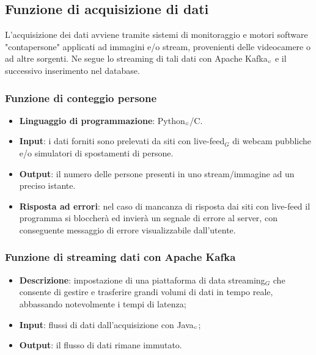 \subsection{Funzione di acquisizione di dati}\label{DescrizioneGeneraleFunzionalitàDelProdottoFunzioneDiAcquisizioneDiDati}
L'acquisizione dei dati avviene tramite sistemi di monitoraggio e motori software "contapersone" applicati ad immagini e/o stream, provenienti delle videocamere o ad altre sorgenti. Ne segue lo streaming di tali dati con Apache Kafka$_{\scaleto{G}{3pt}}$ e il successivo inserimento nel database.

\subsubsection{Funzione di conteggio persone}\label{DescrizioneGeneraleFunzionalitàDelProdottoFunzioneDiAcquisizioneDiDatiFunzioneDiConteggioPersone}
\begin{itemize}
\item \textbf{Linguaggio di programmazione}: Python$_{\scaleto{G}{3pt}}$/C.
\item \textbf{Input}: i dati forniti sono prelevati da siti con live-feed$_G$ di webcam pubbliche e/o simulatori di spostamenti di persone.
\item \textbf{Output}: il numero delle persone presenti in uno stream/immagine ad un preciso istante.
\item \textbf{Risposta ad errori}: nel caso di mancanza di risposta dai siti con live-feed il programma si bloccherà ed invierà un segnale di errore al server, con conseguente messaggio di errore visualizzabile dall'utente.
\end{itemize}

\subsubsection{Funzione di streaming dati con Apache Kafka}\label{DescrizioneGeneraleFunzionalitàDelProdottoFunzioneDiAcquisizioneDiDatiFunzioneDiStreamingDatiConApacheKafka}

\begin{itemize}
	\item \textbf{Descrizione}: impostazione di una piattaforma di data streaming$_G$ che consente di gestire e trasferire grandi volumi di dati in tempo reale, abbassando notevolmente i tempi di latenza;
	\item \textbf{Input}: flussi di dati dall'acquisizione con Java$_{\scaleto{G}{3pt}}$;
		\item \textbf{Output}: il flusso di dati rimane immutato.
\end{itemize}

